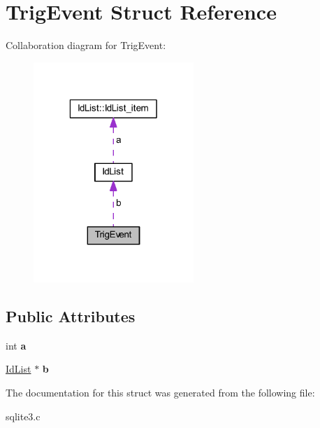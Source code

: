 \hypertarget{struct_trig_event}{\section{Trig\-Event Struct Reference}
\label{struct_trig_event}
}


Collaboration diagram for Trig\-Event\-:\nopagebreak
\begin{figure}[H]
\begin{center}
\leavevmode
\includegraphics[width=172pt]{struct_trig_event__coll__graph}
\end{center}
\end{figure}
\subsection*{Public Attributes}
\begin{DoxyCompactItemize}
\item 
\hypertarget{struct_trig_event_a19ac5a5e59e08350f72ec49cf8fccbb6}{int {\bfseries a}}\label{struct_trig_event_a19ac5a5e59e08350f72ec49cf8fccbb6}

\item 
\hypertarget{struct_trig_event_a86ef160cde95382e98b7934614e7f79f}{\hyperlink{struct_id_list}{Id\-List} $\ast$ {\bfseries b}}\label{struct_trig_event_a86ef160cde95382e98b7934614e7f79f}

\end{DoxyCompactItemize}


The documentation for this struct was generated from the following file\-:\begin{DoxyCompactItemize}
\item 
sqlite3.\-c\end{DoxyCompactItemize}
